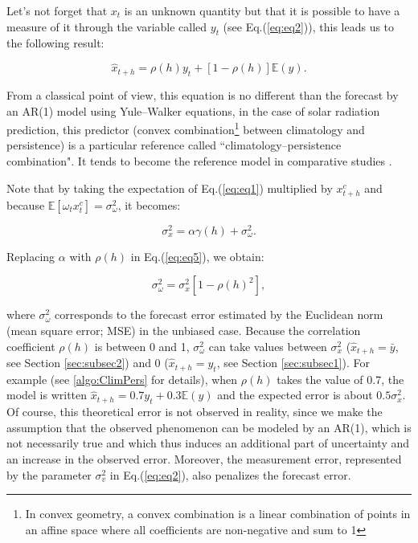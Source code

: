 \documentclass[preprint,12pt,3p]{elsarticle}
\begin{document}
Let's not forget that $x_t$ is an unknown quantity but that it is possible to have a measure of it through the variable called $y_t$ (see Eq.(\ref{eq:eq2})), this leads us to the following result:

\begin{equation}
\label{eq:eq4}
\widehat{x}_{t+h}=\rho(h)y_t+\left[1-\rho(h)\right]\mathbb{E}(y).
\end{equation}

From a classical point of view, this equation is no different than the forecast by an AR(1) model using Yule--Walker equations, in the case of solar radiation prediction, this predictor (convex combination\footnote{In convex geometry, a convex combination is a linear combination of points in an affine space where all coefficients are non-negative and sum to 1} between climatology and persistence) is a particular reference called ``climatology--persistence combination". It tends to become the reference model in comparative studies \citep{YANG2019981}.

Note that by taking the expectation of Eq.(\ref{eq:eq1}) multiplied by $x^c_{t+h}$ and because  $\mathbb{E}[\omega_t x^c_t]=\sigma^2_{\omega}$, it becomes:

\begin{equation}
\label{eq:eq5}
\sigma_x^2=\alpha \gamma(h)+\sigma^2_{\omega}.
\end{equation}

Replacing $\alpha$ with $\rho(h)$ in Eq.(\ref{eq:eq5}), we obtain: 

\begin{equation}
\label{eq:eq6}
\sigma^2_{\omega}=\sigma_x^2[1-\rho(h)^2],
\end{equation}

\noindent where $\sigma^2_{\omega}$ corresponds to the forecast error estimated by the Euclidean norm (mean square error; MSE) in the unbiased case.
Because the correlation coefficient $\rho(h)$ is between 0 and 1, $\sigma^2_{\omega}$ can take values between $\sigma_x^2$ ($\widehat{x}_{t+h}=\bar{y}$, see Section \ref{sec:subsec2}) and 0 ($\widehat{x}_{t+h}=y_t$, see Section \ref{sec:subsec1}). For example (see \ref{algo:ClimPers} for details), when $\rho(h)$ takes the value of 0.7, the model is written $\widehat{x}_{t+h}=0.7y_t+0.3\mathbb{E}(y)$ and the expected error is about $0.5\sigma_x^2$. Of course, this theoretical error is not observed in reality, since we make the assumption that the observed phenomenon can be modeled by an AR(1), which is not necessarily true and which thus induces an additional part of uncertainty and an increase in the observed error. 
Moreover, the measurement error, represented by the parameter $\sigma^2_{v}$ in Eq.(\ref{eq:eq2}), also penalizes the forecast error.
 
\end{document}
